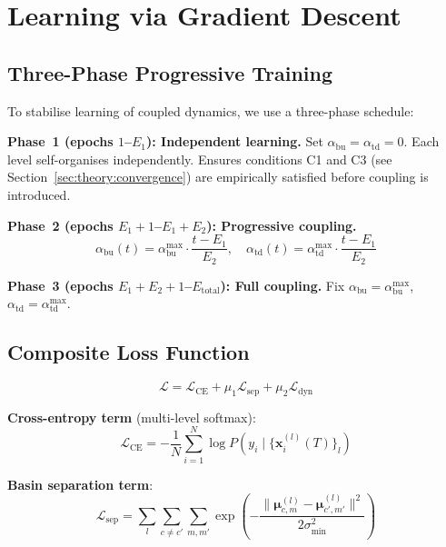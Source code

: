 \documentclass[11pt,a4paper]{article}
\begin{document}
\section{Learning via Gradient Descent}
\label{sec:learning}

\subsection{Three-Phase Progressive Training}
\label{sec:three-phase}

To stabilise learning of coupled dynamics, we use a three-phase schedule:

\textbf{Phase~1 (epochs $1$--$E_1$): Independent learning.}
Set $\alpha_{\mathrm{bu}} = \alpha_{\mathrm{td}} = 0$. Each level self-organises
independently. Ensures conditions C1 and C3 (see Section~\ref{sec:theory:convergence}) are
empirically satisfied before coupling is introduced.

\textbf{Phase~2 (epochs $E_1+1$--$E_1+E_2$): Progressive coupling.}
\begin{equation}
  \alpha_{\mathrm{bu}}(t) = \alpha_{\mathrm{bu}}^{\max} \cdot \frac{t - E_1}{E_2},
  \quad
  \alpha_{\mathrm{td}}(t) = \alpha_{\mathrm{td}}^{\max} \cdot \frac{t - E_1}{E_2}
\end{equation}

\textbf{Phase~3 (epochs $E_1+E_2+1$--$E_{\mathrm{total}}$): Full coupling.}
Fix $\alpha_{\mathrm{bu}} = \alpha_{\mathrm{bu}}^{\max}$,
$\alpha_{\mathrm{td}} = \alpha_{\mathrm{td}}^{\max}$.

\subsection{Composite Loss Function}

\begin{equation}
  \mathcal{L} = \mathcal{L}_{\mathrm{CE}} + \mu_1 \mathcal{L}_{\mathrm{sep}} + \mu_2 \mathcal{L}_{\mathrm{dyn}}
\label{eq:loss}
\end{equation}

\textbf{Cross-entropy term} (multi-level softmax):
\begin{equation}
  \mathcal{L}_{\mathrm{CE}} = -\frac{1}{N} \sum_{i=1}^{N} \log P(y_i \mid \{\mathbf{x}_i^{(l)}(T)\}_l)
\end{equation}

\textbf{Basin separation term}:
\begin{equation}
  \mathcal{L}_{\mathrm{sep}} = \sum_{l} \sum_{c \ne c'} \sum_{m,m'}
    \exp\!\left(-\frac{\|\boldsymbol{\mu}^{(l)}_{c,m} - \boldsymbol{\mu}^{(l)}_{c',m'}\|^2}
                       {2\sigma^2_{\min}}\right)
\end{equation}
\end{document}
